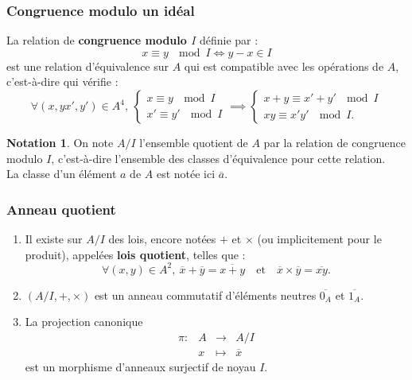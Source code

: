\documentclass[french]{article}
\theoremstyle{plain}
\theoremstyle{definition}
\newtheorem*{notation}{Notation}
\theoremstyle{remark}
\begin{document}
\subsubsection*{Congruence modulo un idéal}

\begin{prop}%
	La relation de \textbf{congruence modulo $I$} définie par :
	$$x\equiv y\ \mod I\iff y-x\in I$$ est une relation d'équivalence sur $A$ qui est compatible avec les opérations de $A$, c'est-à-dire qui vérifie :
	$$\forall (x,yx',y')\in A^4,\ \begin{cases}
		x\equiv y\ \mod I\\
		x'\equiv y'\ \mod I
	\end{cases}\implies\begin{cases}
	x+y\equiv x'+y'\ \mod I\\
	xy\equiv x'y'\ \mod I.
	\end{cases}$$
\end{prop}

\begin{notation}
	On note $A/I$ l'ensemble quotient de $A$ par la relation de congruence modulo $I$, c'est-à-dire l'ensemble des classes d'équivalence pour cette relation.\\
	La classe d'un élément $a$ de $A$ est notée ici $\overline{a}$.
\end{notation}

\subsubsection*{Anneau quotient}

\begin{prop}%
	\begin{enumerate}
		\item Il existe sur $A/I$ des lois, encore notées $+$ et $\times$ (ou implicitement pour le produit), appelées \textbf{lois quotient}, telles que :
		$$\forall (x,y)\in A^2,\ \overline{x}+\overline{y}=\overline{x+y}\quad\text{et}\quad\overline{x}\times\overline{y}=\overline{xy}.$$
		\item $(A/I,+,\times)$ est un anneau commutatif d'éléments neutres $\overline{0_A}$ et $\overline{1_A}$.
		\item La projection canonique $$\begin{array}{lrcl}
			\pi:&A&\longrightarrow&A/I\\
			&x&\longmapsto&\overline{x}
		\end{array}$$ est un morphisme d'anneaux surjectif de noyau $I$.
	\end{enumerate}
\end{prop}
\end{document}
